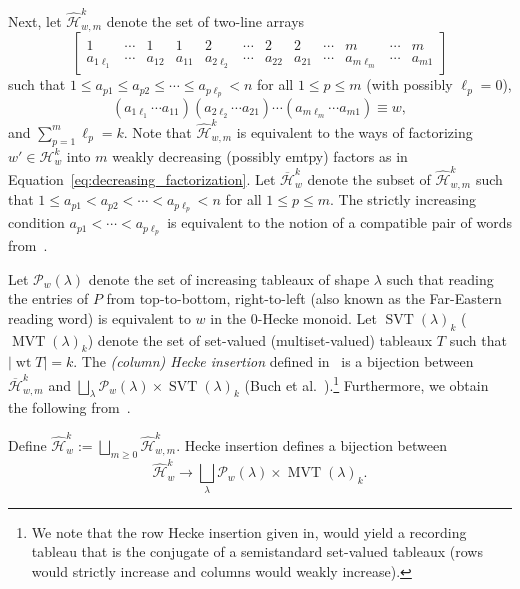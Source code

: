 \documentclass[ALCO,ThmDefs,Unicode,epreuves]{cedram}
\newcommand{\HH}{\mathcal{H}}
\newcommand{\abs}[1]{\lvert #1 \rvert}
\DeclareMathOperator{\wt}{wt} %
\DeclareMathOperator{\svt}{SVT} %
\DeclareMathOperator{\mvt}{MVT} %
\newcommand{\mcP}{\mathcal{P}}
\newcommand{\defn}[1]{{\color{darkred}\emph{#1}}} %
\begin{document}
Next, let $\widehat{\HH}_{w,m}^k$ denote the set of two-line arrays
\[
\left[
\begin{array}{cccccccccccc}
1 & \cdots & 1 & 1 & 2 & \cdots & 2 & 2 & \cdots & m & \cdots & m \\
a_{1\ell_1} & \cdots & a_{12} & a_{11} & a_{2\ell_2} & \cdots & a_{22} & a_{21} & \cdots & a_{m\ell_m} & \cdots & a_{m1}
\end{array}
\right]
\]
such that $1 \leq a_{p1} \leq a_{p2} \leq \cdots \leq a_{p\ell_p} < n$ for all $1 \leq p \leq m$ (with possibly $\ell_p = 0$),
\begin{equation}
\label{eq:decreasing_factorization}
(a_{1\ell_1} \cdots a_{11}) (a_{2\ell_2} \cdots a_{21}) \cdots (a_{m\ell_m} \cdots a_{m1}) \equiv w,
\end{equation}
and $\sum_{p=1}^m \ell_p = k$.
Note that $\widehat{\HH}_{w,m}^k$ is equivalent to the ways of factorizing $w' \in \HH_w^k$ into $m$ weakly decreasing (possibly emtpy) factors as in Equation~\eqref{eq:decreasing_factorization}.
Let $\overline{\HH}_w^k$ denote the subset of $\widehat{\HH}_{w,m}^k$ such that $1 \leq a_{p1} < a_{p2} <\cdots < a_{p\ell_p} < n$ for all $1 \leq p \leq m$.
The strictly increasing condition $a_{p1} < \cdots < a_{p\ell_p}$ is equivalent to the notion of a compatible pair of words from~\cite{BKSTY08}.

Let $\mcP_w(\lambda)$ denote the set of increasing tableaux of shape $\lambda$ such that reading the entries of $P$ from top-to-bottom, right-to-left (\ie also known as the Far-Eastern reading word) is equivalent to $w$ in the $0$-Hecke monoid.
Let $\svt(\lambda)_k$ (\resp $\mvt(\lambda)_k$) denote the set of set-valued (\resp multiset-valued) tableaux $T$ such that $\abs{\wt{T}} = k$.
The \defn{(column) Hecke insertion} defined in~\cite{BKSTY08} is a bijection between $\overline{\HH}_{w,m}^k$ and $\bigsqcup_{\lambda} \mcP_w(\lambda) \times \svt(\lambda)_k$ (Buch et al.~\cite[Lemma~1,Thm.~4]{BKSTY08}).\footnote{We note that the row Hecke insertion given in, \eg \cite{PP16,sage,TY11} would yield a recording tableau that is the conjugate of a semistandard set-valued tableaux (\ie rows would strictly increase and columns would weakly increase).}
Furthermore, we obtain the following from~\cite[Lemma~2]{BKSTY08}.

\begin{prop}
Define $\widehat{\HH}_w^k := \bigsqcup_{m \geq 0} \widehat{\HH}_{w,m}^k$.
Hecke insertion defines a bijection between
\[
\widehat{\HH}_w^k \to \bigsqcup_{\lambda} \mcP_w(\lambda) \times \mvt(\lambda)_k.
\]
\end{prop}
\end{document}
